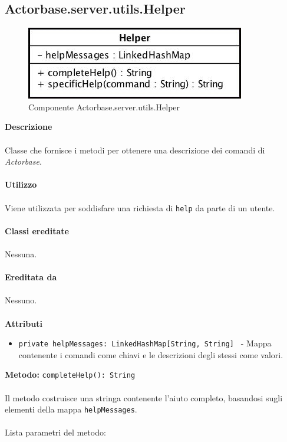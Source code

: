 \documentclass[a4paper]{article}
\begin{document}
	\subsection{Actorbase.server.utils.Helper}
		\begin{figure}[H]
			\centering
			\includegraphics[scale = 0.6]{Server/helperClass.jpg}
			\caption{Componente Actorbase.server.utils.Helper}
		\end{figure}
		\textbf{Descrizione}
			\\ \\
			Classe che fornisce i metodi per ottenere una descrizione dei comandi di \emph{Actorbase}.
			\\ \\
		\textbf{Utilizzo}
			\\ \\
			Viene utilizzata per soddisfare una richiesta di \texttt{help} da parte di un utente.
			\\ \\
		\textbf{Classi ereditate}
			\\ \\
			Nessuna.
			\\ \\
		\textbf{Ereditata da}
			\\ \\
			Nessuno.
			\\ \\
		\textbf{Attributi}
			\begin{itemize}
				\item \texttt{private helpMessages: LinkedHashMap[String, String] } - Mappa contenente i comandi come chiavi e le descrizioni degli stessi come valori.
			\end{itemize}
		\textbf{Metodo: }\texttt{completeHelp(): String}
			\\ \\
			Il metodo costruisce una stringa contenente l'aiuto completo, basandosi sugli elementi della mappa \texttt{helpMessages}.
			\\ \\
			Lista parametri del metodo:
			\\ \\
\end{document}
